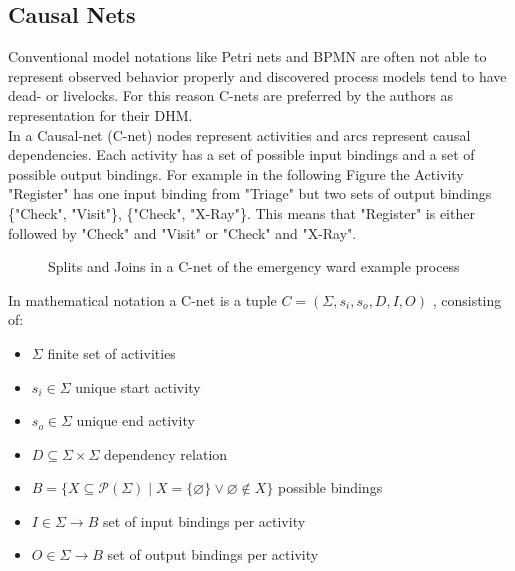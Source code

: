 \subsection{Causal Nets}
Conventional model notations like Petri nets and BPMN are often not able to represent observed behavior properly and discovered process models tend to have dead- or livelocks. For this reason C-nets are preferred by the authors as representation for their DHM.\\
In a Causal-net (C-net) nodes represent activities and arcs represent causal dependencies. Each activity has a set of possible input bindings and a set of possible output bindings. For example in the following Figure the Activity "Register" has one input binding from "Triage" but two sets of output bindings \{"Check", "Visit"\}, \{"Check", "X-Ray"\}. This means that "Register" is either followed by "Check" and "Visit" or "Check" and "X-Ray".\protect\cite{Mannhardt17}\protect\cite{VanDerAlst11}

\begin{figure} [H]
\caption{Splits and Joins in a C-net of the emergency ward example process\protect\cite{Mannhardt17}\protect\cite{VanDerAlst11}} 
\end{figure}
\vspace{3pt}

\noindent In mathematical notation a C-net is a tuple $C = (\Sigma, s_i , s_o , D, I, O)$ , consisting of:
\begin{itemize}
\setlength{\itemsep}{2pt}
\item{$\Sigma$ finite set of activities}
\item{$s_i \in \Sigma$ unique start activity}
\item{$s_o \in \Sigma$ unique end activity}
\item{$D \subseteq \Sigma \times \Sigma$ dependency relation}
\item{$B = \{X \subseteq \mathscr{P} (\Sigma) \; \rvert \; X = \{ \varnothing \} \vee \varnothing \notin X \} $ possible bindings}
\item{$I \in \Sigma \rightarrow B$ set of input bindings per activity}
\item{$O \in \Sigma \rightarrow B$ set of output bindings per activity}\\
\protect\cite{Mannhardt17}
\end{itemize}



